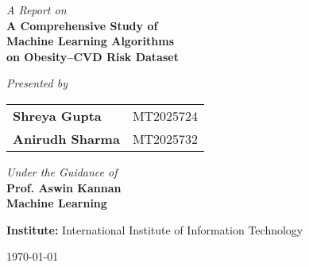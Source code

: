 \begin{titlepage}
    \centering
    \vspace*{2cm}

    \Large
    \textit{A Report on} \\
    \Huge
    \textbf{
        A Comprehensive Study of\\
        Machine Learning Algorithms\\
        on Obesity–CVD Risk Dataset}\\

    \vspace{2cm}

    \Large
    \textit{Presented by}\\
    \begin{center}
        \begin{tabular}{@{} l l @{}}
            \textbf{Shreya Gupta}   & MT2025724 \\[0.3cm]
            \textbf{Anirudh Sharma} & MT2025732 \\
        \end{tabular}
    \end{center}

    \vspace{2cm}

    \textit{Under the Guidance of}\\
    \textbf{Prof. Aswin Kannan}\\
    \textbf{Machine Learning}\\

    \vfill

    \textbf{Institute:} International Institute of Information Technology\\
    {\large \today\par}

\end{titlepage}
